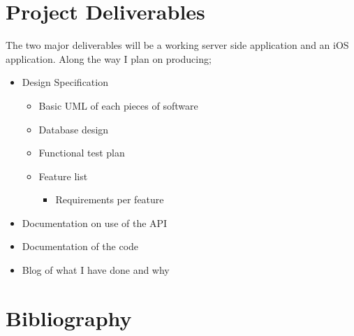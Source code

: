 \documentclass[11pt,fleqn,twoside]{article}
\begin{document}
		\section{Project Deliverables}
		The two major deliverables will be a working server side application and an iOS application. Along the way I plan on producing;
		\begin{itemize}
			\item Design Specification
			\begin{itemize}
					\item Basic UML of each pieces of software
					\item Database design
					\item Functional test plan
					\item Feature list
						\begin{itemize}
							\item Requirements per feature
						\end{itemize}
				\end{itemize}
			\item Documentation on use of the API
			\item Documentation of the code 
			\item Blog of what I have done and why
		\end{itemize}

		\section{Bibliography}



%
%


\nocite{*} %
\end{document}
